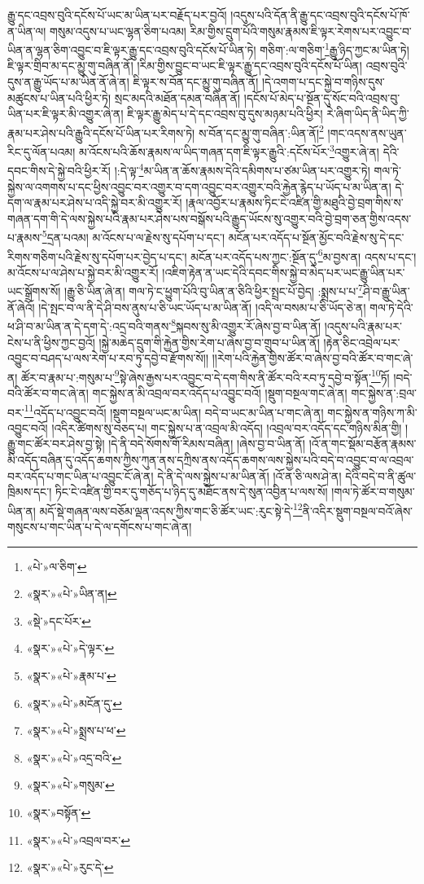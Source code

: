 རྒྱུ་དང་འབྲས་བུའི་དངོས་པོ་ཡང་མ་ཡིན་པར་བརྗོད་པར་བྱའོ། །འདུས་པའི་དོན་ནི་རྒྱུ་དང་འབྲས་བུའི་དངོས་པོ་ཁོ་ན་ཡིན་ལ། གསུམ་འདུས་པ་ཡང་ལྷན་ཅིག་པའམ། རིམ་གྱིས་དྲུག་པོའི་གསུམ་རྣམས་ཇི་ལྟར་རེགས་པར་འབྱུང་བ་ཡིན་ན་ལྷན་ཅིག་འབྱུང་བ་ཇི་ལྟར་རྒྱུ་དང་འབྲས་བུའི་དངོས་པོ་ཡིན་ཏེ། གཅིག་:ལ་གཅིག་\footnote{«པེ་»ལ་ཅིག་}རྒྱུ་ཉིད་ཀྱང་མ་ཡིན་ཏེ། ཇི་ལྟར་གྲིབ་མ་དང་མྱུ་གུ་བཞིན་ནོ། །རིམ་གྱིས་བྱུང་བ་ཡང་ཇི་ལྟར་རྒྱུ་དང་འབྲས་བུའི་དངོས་པོ་ཡིན། འབྲས་བུའི་དུས་ན་རྒྱུ་ཡོད་པ་མ་ཡིན་ནོ་ཞེ་ན། ཇི་ལྟར་ས་བོན་དང་མྱུ་གུ་བཞིན་ནོ། །དེ་འགག་པ་དང་སྐྱེ་བ་གཉིས་དུས་མཚུངས་པ་ཡིན་པའི་ཕྱིར་ཏེ། སྲང་མདའི་མཐོན་དམན་བཞིན་ནོ། །དངོས་པོ་མེད་པ་སྔོན་དུ་སོང་བའི་འབྲས་བུ་ཡིན་པར་ཇི་ལྟར་མི་འགྱུར་ཞེ་ན། ཇི་ལྟར་རྒྱུ་མེད་པ་དེ་དང་འབྲས་བུ་དུས་མཉམ་པའི་ཕྱིར། རེ་ཞིག་ཡིད་ནི་ཡིད་ཀྱི་རྣམ་པར་ཤེས་པའི་རྒྱུའི་དངོས་པོ་ཡིན་པར་རིགས་ཏེ། ས་བོན་དང་མྱུ་གུ་བཞིན་:ཡིན་ནོ།\footnote{«སྣར་»«པེ་»ཡིན་ན།} །གང་འདས་ནས་ཡུན་རིང་དུ་ལོན་པའམ། མ་འོངས་པའི་ཆོས་རྣམས་ལ་ཡིད་གཞན་དག་ཇི་ལྟར་རྒྱུའི་:དངོས་པོར་\footnote{«སྡེ་»དང་པོར་}འགྱུར་ཞེ་ན། དེའི་དབང་གིས་དེ་སྐྱེ་བའི་ཕྱིར་རོ། །:དེ་ལྟ་\footnote{«སྣར་»«པེ་»དེ་ལྟར་}མ་ཡིན་ན་ཆོས་རྣམས་དེའི་དམིགས་པ་ཙམ་ཡིན་པར་འགྱུར་ཏེ། གལ་ཏེ་སྐྱེས་ལ་འགགས་པ་དང་ཕྱིས་འབྱུང་བར་འགྱུར་བ་དག་འབྱུང་བར་འགྱུར་བའི་རྐྱེན་རྙེད་པ་ཡོད་པ་མ་ཡིན་ན། དེ་དག་ལ་རྣམ་པར་ཤེས་པ་འདི་སྐྱེ་བར་མི་འགྱུར་རོ། །རྣལ་འབྱོར་པ་རྣམས་ཏིང་ངེ་འཛིན་གྱི་མཐུའི་བྱེ་བྲག་གིས་ས་གཞན་དག་གི་དེ་ལས་སྐྱེས་པའི་རྣམ་པར་ཤེས་པས་བསྒོས་པའི་རྒྱུད་ཡོངས་སུ་འགྱུར་བའི་བྱེ་བྲག་ཅན་གྱིས་འདས་པ་རྣམས་\footnote{«སྣར་»«པེ་»རྣམ་པ་}དྲན་པའམ། མ་འོངས་པ་ལ་རྗེས་སུ་དཔོག་པ་དང་། མངོན་པར་འདོད་པ་སྔོན་མྱོང་བའི་རྗེས་སུ་དེ་དང་རིགས་གཅིག་པའི་རྗེས་སུ་དཔོག་པར་བྱེད་པ་དང་། མངོན་པར་འདོད་པས་ཀྱང་:སྔོན་དུ་\footnote{«སྣར་»«པེ་»མངོན་དུ་}མ་བྱས་ན། འདས་པ་དང་། མ་འོངས་པ་ལ་ཤེས་པ་སྐྱེ་བར་མི་འགྱུར་རོ། །འཇིག་རྟེན་ན་ཡང་དེའི་དབང་གིས་སྐྱེ་བ་མེད་པར་ཡང་རྒྱུ་ཡིན་པར་ཡང་སྒྲོགས་སོ། །རྒྱུ་ཅི་ཡིན་ཞེ་ན། གལ་ཏེ་ང་ཕྱུག་པོའི་བུ་ཡིན་ན་ཅིའི་ཕྱིར་སྤྲང་པོ་བྱེད། :སྨྲས་པ་པ་\footnote{«སྣར་»«པེ་»སྨྲས་པ་ཕ་}ཤི་བ་རྒྱུ་ཡིན་ནོ་ཞེའོ། །དེ་སྤང་བ་ལ་ནི་དེ་ཤི་བས་ནུས་པ་ཅི་ཡང་ཡོད་པ་མ་ཡིན་ནོ། །འདི་ལ་བསམ་པ་ཅི་ཡོད་ཅེ་ན། གལ་ཏེ་དེའི་ཕ་ཤི་བ་མ་ཡིན་ན་དེ་དག་དེ་:འདྲ་བའི་གནས་\footnote{«སྣར་»«པེ་»འདྲ་བའི་}སྐབས་སུ་མི་འགྱུར་རོ་ཞེས་བྱ་བ་ཡིན་ནོ། །འདུས་པའི་རྣམ་པར་ངེས་པ་ནི་ཕྱིས་ཀྱང་བྱའོ། །སྐྱེ་མཆེད་དྲུག་གི་རྐྱེན་གྱིས་རེག་པ་ཞེས་བྱ་བ་གྲུབ་པ་ཡིན་ནོ། །རྟེན་ཅིང་འབྲེལ་པར་འབྱུང་བ་བཤད་པ་ལས་རེག་པ་རབ་ཏུ་དབྱེ་བ་རྫོགས་སོ།། །།རེག་པའི་རྐྱེན་གྱིས་ཚོར་བ་ཞེས་བྱ་བའི་ཚོར་བ་གང་ཞེ་ན། ཚོར་བ་རྣམ་པ་:གསུམ་པ་\footnote{«སྣར་»«པེ་»གསུམ་}སྟེ་ཞེས་རྒྱས་པར་འབྱུང་བ་དེ་དག་གིས་ནི་ཚོར་བའི་རབ་ཏུ་དབྱེ་བ་སྟོན་\footnote{«སྣར་»བསྟོན་}ཏོ། །བདེ་བའི་ཚོར་བ་གང་ཞེ་ན། གང་སྐྱེས་ན་མི་འབྲལ་བར་འདོད་པ་འབྱུང་བའོ། །སྡུག་བསྔལ་གང་ཞེ་ན། གང་སྐྱེས་ན་:བྲལ་བར་\footnote{«སྣར་»«པེ་»འབྲལ་བར་}འདོད་པ་འབྱུང་བའོ། །སྡུག་བསྔལ་ཡང་མ་ཡིན། བདེ་བ་ཡང་མ་ཡིན་པ་གང་ཞེ་ན། གང་སྐྱེས་ན་གཉིས་ཀ་མི་འབྱུང་བའོ། །འདིར་ཚིགས་སུ་བཅད་པ། གང་སྐྱེས་པ་ན་འབྲལ་མི་འདོད། །འབྲལ་བར་འདོད་དང་གཉིས་མིན་གྱི། །རྒྱུ་གང་ཚོར་བར་ཤེས་བྱ་སྟེ། །དེ་ནི་བདེ་སོགས་གོ་རིམས་བཞིན། །ཞེས་བྱ་བ་ཡིན་ནོ། །འོ་ན་གང་སྡོམ་བརྩོན་རྣམས་མི་འདོད་བཞིན་དུ་འདོད་ཆགས་ཀྱིས་ཀུན་ནས་དཀྲིས་ནས་འདོད་ཆགས་ལས་སྐྱེས་པའི་བདེ་བ་འབྱུང་བ་ལ་འབྲལ་བར་འདོད་པ་གང་ཡིན་པ་འབྱུང་ངོ་ཞེ་ན། དེ་ནི་དེ་ལས་སྐྱེས་པ་མ་ཡིན་ནོ། །འོ་ན་ཅི་ལས་ཤེ་ན། དེའི་བདེ་བ་ནི་ཚུལ་ཁྲིམས་དང་། ཏིང་ངེ་འཛིན་གྱི་བར་དུ་གཅོད་པ་ཉིད་དུ་མཐོང་ནས་དེ་སུན་འབྱིན་པ་ལས་སོ། །གལ་ཏེ་ཚོར་བ་གསུམ་ཡིན་ན། མདོ་སྡེ་གཞན་ལས་བཅོམ་ལྡན་འདས་ཀྱིས་གང་ཅི་ཚོར་ཡང་:རུང་སྟེ་དེ་\footnote{«སྣར་»«པེ་»རུང་དེ་}ནི་འདིར་སྡུག་བསྔལ་བའོ་ཞེས་གསུངས་པ་གང་ཡིན་པ་དེ་ལ་དགོངས་པ་གང་ཞེ་ན། 